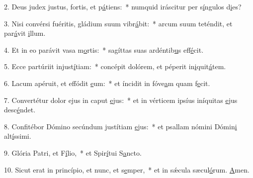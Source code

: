 2. Deus judex justus, fortis, et p\uline{á}tiens:~* numquid iráscitur per s\uline{í}ngulos d\uline{i}es?\par 
3. Nisi convérsi fuéritis, gládium suum vibr\uline{á}bit:~* arcum suum teténdit, et par\uline{á}vit \uline{i}llum.\par 
4. Et in eo parávit vasa m\uline{o}rtis:~* sagíttas suas ardéntib\uline{u}s eff\uline{é}cit.\par 
5. Ecce partúriit injust\uline{í}tiam:~* concépit dolórem, et péperit in\uline{i}quit\uline{á}tem.\par 
6. Lacum apéruit, et effódit \uline{e}um:~* et íncidit in fóve\uline{a}m quam f\uline{e}cit.\par 
7. Convertétur dolor ejus in caput \uline{e}jus:~* et in vérticem ipsíus iníquitas \uline{e}jus desc\uline{é}ndet.\par 
8. Confitébor Dómino secúndum justítiam \uline{e}jus:~* et psallam nómini Dómin\uline{i} alt\uline{í}ssimi.\par 
9. Glória Patri, et F\uline{í}lio,~* et Spir\uline{í}tui S\uline{a}ncto.\par 
10. Sicut erat in princípio, et nunc, et s\uline{e}mper,~* et in sǽcula sæcul\uline{ó}rum. \uline{A}men.\par 
